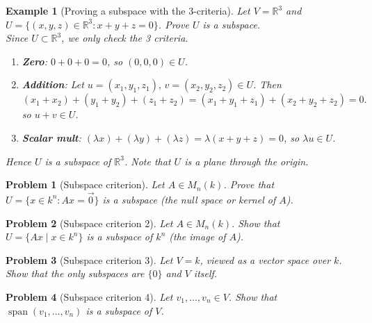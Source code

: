\documentclass{article}
\newtheorem{problem}{Problem}
\newtheorem*{example}{Example}
\newcommand{\Span}{\operatorname{span}}
\begin{document}
\begin{example}[Proving a subspace with the 3-criteria]
    Let $V=\mathbb{R}^3$ and $U=\{(x,y,z)\in\mathbb{R}^3 : x+y+z=0\}$. Prove $U$ is a subspace.\\
    Since $U\subset\mathbb{R}^3$, we only check the 3 criteria.
    \begin{enumerate}
        \item \textbf{Zero}: $0+0+0=0$, so $(0,0,0)\in U$. \checkmark
        \item \textbf{Addition}: Let $u=(x_1,y_1,z_1),\,v=(x_2,y_2,z_2)\in U$. Then
        \[(x_1+x_2)+(y_1+y_2)+(z_1+z_2)=(x_1+y_1+z_1)+(x_2+y_2+z_2)=0.\]
        so $u+v\in U$. \checkmark
        \item \textbf{Scalar mult}: $(\lambda x)+(\lambda y)+(\lambda z)=\lambda(x+y+z)=0$, so $\lambda u\in U$. \checkmark
    \end{enumerate}
    Hence $U$ is a subspace of $\mathbb{R}^3$. Note that $U$ is a plane through the origin.
\end{example}
\begin{problem}[Subspace criterion]
    Let $A \in M_n(k)$. Prove that $U = \{x \in k^n : Ax = \vec{0}\}$ is a subspace (the null space or kernel of $A$).
\end{problem}
\begin{problem}[Subspace criterion 2]
    Let $A \in M_n(k)$. Show that $U = \{Ax \mid x \in k^n\}$ is a subspace of $k^n$ (the image of $A$).
\end{problem}
\begin{problem}[Subspace criterion 3]
    Let $V = k$, viewed as a vector space over $k$. Show that the only subspaces are $\{0\}$ and $V$ itself.
\end{problem}
\begin{problem}[Subspace criterion 4]
    Let $v_1,\ldots,v_n \in V$. Show that $\Span(v_1,\ldots,v_n)$ is a subspace of $V$.
\end{problem}
\end{document}
